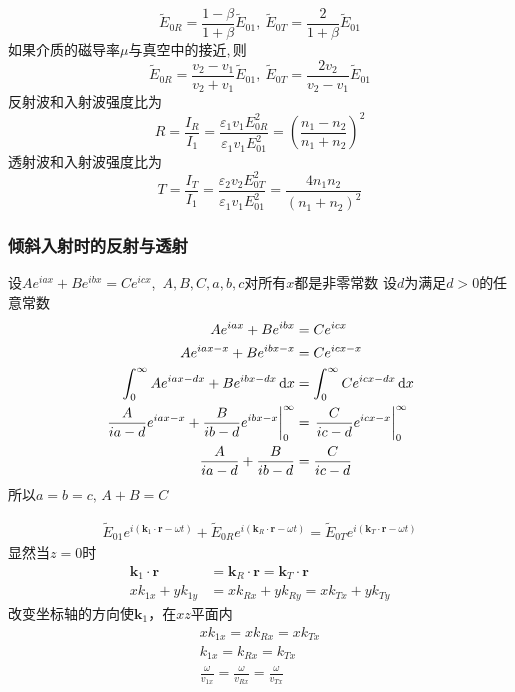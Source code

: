\begin{equation}
    \widetilde{E}_{0R}=\frac{1-\beta}{1+\beta}\widetilde{E}_{01}, \ \widetilde{E}_{0T}=\frac{2}{1+\beta}\widetilde{E}_{01}
\end{equation}
如果介质的磁导率$\mu$与真空中的接近,\,则
\begin{equation}
    \widetilde{E}_{0R}=\frac{v_2-v_1}{v_2+v_1}\widetilde{E}_{01}, \ \widetilde{E}_{0T}=\frac{2v_2}{v_2-v_1}\widetilde{E}_{01}
\end{equation}
反射波和入射波强度比为
\begin{equation}
    R=\frac{I_R}{I_1}=\frac{\varepsilon_1v_1E_{0R}^2}{\varepsilon_1v_1E_{01}^2}=\left(\frac{n_1-n_2}{n_1+n_2}\right)^2
\end{equation}
透射波和入射波强度比为
\begin{equation}
    T=\frac{I_T}{I_1}=\frac{\varepsilon_2v_2E_{0T}^2}{\varepsilon_1v_1E_{01}^2}=\frac{4n_1n_2}{\left(n_1+n_2\right)^2}
\end{equation}
\subsubsection{倾斜入射时的反射与透射}

设$Ae^{iax} +Be^{ibx}=Ce^{icx}$,\, $A,B,C,a,b,c$对所有$x$都是非零常数
设$d$为满足$d>0$的任意常数
\begin{align*}
    Ae^{iax} +Be^{ibx}&=Ce^{icx}\\
    Ae^{iax-x} +Be^{ibx-x}&=Ce^{icx-x}\\
    \int_{0}^{\infty}Ae^{iax-dx} +Be^{ibx-dx}\dif x&=\int_{0}^{\infty}Ce^{icx-dx}\dif x\\
    \left.\frac{A}{ia-d}e^{iax-x} +\frac{B}{ib-d}e^{ibx-x}\right|_0^\infty&=\left.\frac{C}{ic-d}e^{icx-x}\right|_0^\infty\\
    \frac{A}{ia-d}+\frac{B}{ib-d}&=\frac{C}{ic-d}\\
\end{align*}
所以$a=b=c,\, A+B=C$


\begin{align*}
    \widetilde{E}_{01}e^{i(\boldsymbol k_1\cdot\boldsymbol r-\omega t)}+\widetilde{E}_{0R}e^{i(\boldsymbol k_R\cdot\boldsymbol r-\omega t)}=\widetilde{E}_{0T}e^{i(\boldsymbol k_T\cdot\boldsymbol r-\omega t)}
\end{align*}
显然当$z=0$时
\begin{align}
    \boldsymbol k_1\cdot\boldsymbol r
    &=\boldsymbol k_R\cdot\boldsymbol r
    =\boldsymbol k_T\cdot\boldsymbol r\\
    xk_{1x}+yk_{1y}
    &=xk_{Rx}+yk_{Ry}
    =xk_{Tx}+yk_{Ty}
\end{align}
改变坐标轴的方向使$\boldsymbol{k}_1$，在$xz$平面内
\begin{align}
    xk_{1x}
    =xk_{Rx}
    =xk_{Tx}\\
    k_{1x}
    =k_{Rx}
    =k_{Tx}\\
    \frac{\omega}{v_{1x}}
    =\frac{\omega}{v_{Rx}}
    =\frac{\omega}{v_{Tx}}
\end{align}

